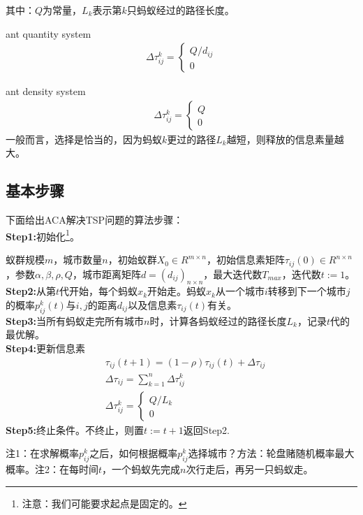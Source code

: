         其中：$Q$为常量，$L_k$表示第$k$只蚂蚁经过的路径长度。
        \par
        ant quantity system
        \begin{align*}
        \Delta\tau_{ij}^k = \left\{
        \begin{aligned}
        Q/d_{ij}\\
        0
        \end{aligned}
        \right.
        \end{align*}
        \par
        ant density system
        \begin{align*}
        \Delta\tau_{ij}^k = \left\{
        \begin{aligned}
        Q\\
        0
        \end{aligned}
        \right.
        \end{align*}
        一般而言，选择是恰当的，因为蚂蚁$k$更过的路径$L_k$越短，则释放的信息素量越大。
    \subsection{基本步骤}
        \par
        下面给出ACA解决TSP问题的算法步骤：\\
        \textbf{Step1:}初始化\footnote{注意：我们可能要求起点是固定的。}。
        \par
        蚁群规模$m$，城市数量$n$，初始蚁群$X_0\in R^{m\times n}$，初始信息素矩阵$\tau_{ij}(0)\in R^{n\times n}$，参数$\alpha,\beta,\rho,Q$，城市距离矩阵$d = (d_{ij})_{n\times n}$，最大迭代数$T_{max}$，迭代数$t:=1$。\\
        \textbf{Step2:}从第$t$代开始，每个蚂蚁$x_k$开始走。蚂蚁$x_k$从一个城市$i$转移到下一个城市$j$的概率$p_{ij}^k(t)$与$i,j$的距离$d_{ij}$以及信息素$\tau_{ij}(t)$有关。\\
        \textbf{Step3:}当所有蚂蚁走完所有城市$n$时，计算各蚂蚁经过的路径长度$L_k$，记录$t$代的最优解。\\
        \textbf{Step4:}更新信息素
        \begin{align*}
        & \tau_{ij}(t+1) = (1-\rho)\tau_{ij}(t)+\Delta\tau_{ij}\\
        & \Delta\tau_{ij} = \sum_{k=1}^n\Delta\tau_{ij}^k\\
        & \Delta\tau_{ij}^k = \left\{
        \begin{aligned}
        Q/L_k\\
        0
        \end{aligned}
        \right.
        \end{align*}
        \textbf{Step5:}终止条件。不终止，则置$t:=t+1$返回Step2.
        \par
        注1：在求解概率$p_{ij}^k$之后，如何根据概率$p_{ij}^k$选择城市？方法：轮盘赌随机概率最大概率。注2：在每时间$t$，一个蚂蚁先完成$n$次行走后，再另一只蚂蚁走。
